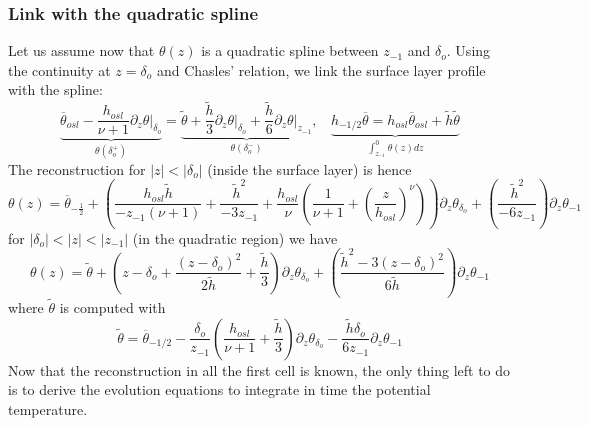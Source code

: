 \subsubsection*{Link with the quadratic spline}
Let us assume now that  $\theta(z)$ is a quadratic spline between
$z_{-1}$ and $\delta_o$.
Using the continuity at $z=\delta_o$ and Chasles' relation,
we link the surface layer profile with the spline:
\begin{equation}
\underbrace{
    \overline{\theta}_{osl} -
    \frac{h_{osl}}{\nu+1}\left. \partial_z \theta
    \right|_{\delta_o}}_{\theta(\delta_o^{+})}
    =
    \underbrace{
    \widetilde{\theta}
    + \frac{\widetilde{h}}{3}
    \left.\partial_z \theta\right|_{\delta_o}
    + \frac{\widetilde{h}}{6}
	\left.\partial_z \theta\right|_{z_{-1}}}_{
	\theta(\delta_o^{-})}
	,
    ~~~~
	\underbrace{
    h_{-1/2} \overline{\theta} = 
    h_{osl}\overline{\theta}_{osl} +\widetilde{h}
    \widetilde{\theta}}_{
    \int_{z_{-1}}^{0}\theta(z) dz
    }
\end{equation}
The reconstruction for $|z|<|\delta_o|$ (inside the surface layer) is hence
\begin{equation}
    \theta(z) =
    \overline{\theta}_{-\frac{1}{2}}
    +
	\left(\frac{h_{osl}\widetilde{h}}{-z_{-1}(\nu+1)} +
	\frac{\widetilde{h}^2}{-3 z_{-1}}
    +
    \frac{h_{osl}}{\nu}\left(
    \frac{1}{\nu+1} + \left(\frac{z}{h_{osl}}
    \right)^\nu
    \right)\right) \partial_z \theta_{\delta_o}
    +
	\left(\frac{\widetilde{h}^2}{-6 z_{-1}}\right)
    \partial_z \theta_{-1}
\end{equation}
for $|\delta_o| < |z| < |z_{-1}|$
(in the quadratic region) we have
\begin{equation}
    \theta(z) =
        \widetilde{\theta}
        +
        \left(
        z-\delta_o + 
        \frac{(z-\delta_o)^2}{2\widetilde{h}}
        + \frac{\widetilde{h}}{3}
        \right)\partial_z \theta_{\delta_o}
        +
        \left(
        \frac{\widetilde{h}^2 - 
        3(z-\delta_o)^2}{6 \widetilde{h}}
        \right)\partial_z \theta_{-1}
\end{equation}
where $\widetilde{\theta}$ is computed with
\begin{equation}
\label{eq:formulaTildeTheta}
\widetilde{\theta} = \overline{\theta}_{-1/2}
	-\frac{\delta_o}{z_{-1}}\left(
\frac{h_{osl}}{\nu+1} + \frac{\widetilde{h}}{3}
\right)\partial_z \theta_{\delta_o}
	- \frac{\widetilde{h}\delta_o}{6z_{-1}}
\partial_z \theta_{-1}
\end{equation}
Now that the reconstruction in all the first cell is known,
the only thing left to do is to derive the evolution equations
to integrate in time the potential temperature.
